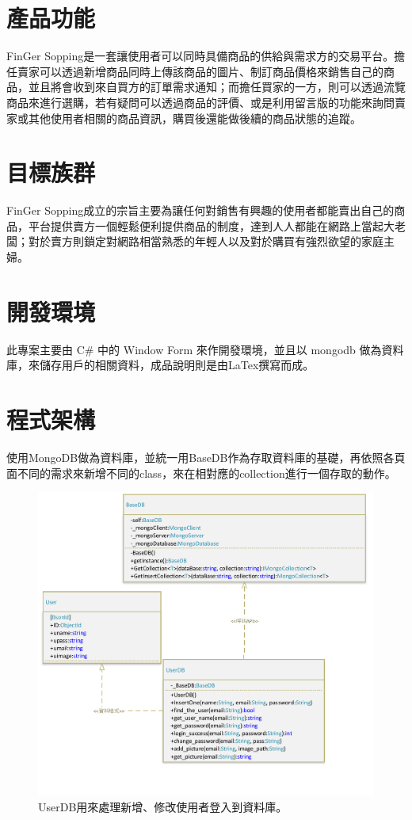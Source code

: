 \documentclass{scrreprt}
\begin{document}
\begin{CJK}{UTF8}{bkai}
\section{產品功能}
\qquad FinGer Sopping是一套讓使用者可以同時具備商品的供給與需求方的交易平台。擔任賣家可以透過新增商品同時上傳該商品的圖片、制訂商品價格來銷售自己的商品，並且將會收到來自買方的訂單需求通知；而擔任買家的一方，則可以透過流覽商品來進行選購，若有疑問可以透過商品的評價、或是利用留言版的功能來詢問賣家或其他使用者相關的商品資訊，購買後還能做後續的商品狀態的追蹤。

\section{目標族群}
\qquad FinGer Sopping成立的宗旨主要為讓任何對銷售有興趣的使用者都能賣出自己的商品，平台提供賣方一個輕鬆便利提供商品的制度，達到人人都能在網路上當起大老闆；對於賣方則鎖定對網路相當熟悉的年輕人以及對於購買有強烈欲望的家庭主婦。

\section{開發環境}
\qquad 此專案主要由 C\# 中的 Window Form 來作開發環境，並且以 mongodb 做為資料庫，來儲存用戶的相關資料，成品說明則是由LaTex撰寫而成。

\section{程式架構}
\qquad 使用MongoDB做為資料庫，並統一用BaseDB作為存取資料庫的基礎，再依照各頁面不同的需求來新增不同的class，來在相對應的collection進行一個存取的動作。\\

\begin{figure}
	\includegraphics[width=\textwidth]{UserDB.pdf}
	\caption{UserDB用來處理新增、修改使用者登入到資料庫。}
\end{figure}


\end{CJK}
\end{document}
